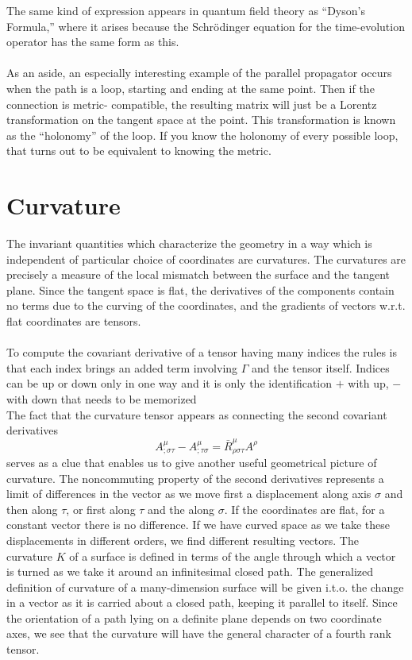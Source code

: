 The same kind of expression appears in quantum field theory as “Dyson’s Formula,” where it arises because the
Schrödinger equation for the time-evolution operator has the same form as this.\\
\\
As an aside, an especially interesting example of the parallel propagator occurs when the
path is a loop, starting and ending at the same point. Then if the connection is metric-
compatible, the resulting matrix will just be a Lorentz transformation on the tangent space
at the point. This transformation is known as the “holonomy” of the loop. If you know
the holonomy of every possible loop, that turns out to be equivalent to knowing the metric.




\section{Curvature}

The invariant quantities which characterize the geometry in a way which is independent of particular choice of coordinates are curvatures. The curvatures are precisely a measure of the local mismatch between the surface and the tangent plane. Since the tangent space is flat, the derivatives of the components contain no terms due to the curving of the coordinates, and the gradients of vectors w.r.t. flat coordinates are tensors.\\
\\
To compute the covariant derivative of a tensor having many indices the rules is that each index brings an added term involving $\Gamma$ and the tensor itself. Indices can be up or down only in one way and it is only the identification $+$ with up, $-$ with down that needs to be memorized
\\
The fact that the curvature tensor appears as  connecting the second covariant derivatives 
\begin{equation}
A^\mu_{; \sigma \tau} - A^\mu_{;\tau \sigma} = \bar{R}^\mu_{\rho \sigma \tau} A^\rho
\end{equation}
serves as a clue that enables us to give another useful geometrical picture of curvature. The noncommuting property of the second derivatives represents a limit of differences in the vector as we move first a displacement along axis $\sigma$ and then along $\tau$, or first along $\tau$  and the along $\sigma$. If the coordinates are flat, for a constant vector there is no difference. If we have curved space as we take these displacements in different orders, we find different resulting vectors. The curvature $K$ of a surface is defined in terms of the angle through which a vector is turned as we take it around an infinitesimal closed path. The generalized definition of curvature of a many-dimension surface will be given i.t.o. the change in a vector as it is carried about a closed path, keeping it parallel to itself. Since the orientation of a path lying on a definite plane depends on two coordinate axes, we see that the curvature will have the general character of a fourth rank tensor.

